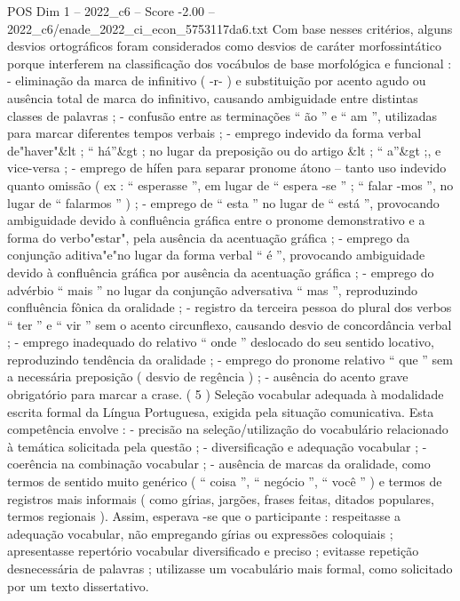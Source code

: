 \begin{textsample}{POS Dim 1 – 2022\_c6 – Score -2.00 – 2022\_c6/enade\_2022\_ci\_econ\_5753117da6.txt}
Com base nesses critérios, alguns desvios ortográficos foram considerados como desvios de caráter morfossintático porque interferem na classificação dos vocábulos de base morfológica e funcional : - eliminação da marca de infinitivo ( -r- ) e substituição por acento agudo ou ausência total de marca do infinitivo, causando ambiguidade entre distintas classes de palavras ; - confusão entre as terminações “ ão ” e “ am ”, utilizadas para marcar diferentes tempos verbais ; - emprego indevido da forma verbal de"haver"\&lt ; “ há”\&gt ; no lugar da preposição ou do artigo \&lt ; “ a”\&gt ;, e vice-versa ; - emprego de hífen para separar pronome átono – tanto uso indevido quanto omissão ( ex : “ esperasse ”, em lugar de “ espera -se ” ; “ falar -mos ”, no lugar de “ falarmos ” ) ; - emprego de “ esta ” no lugar de “ está ”, provocando ambiguidade devido à confluência gráfica entre o pronome demonstrativo e a forma do verbo"estar", pela ausência da acentuação gráfica ; - emprego da conjunção aditiva"e"no lugar da forma verbal “ é ”, provocando ambiguidade devido à confluência gráfica por ausência da acentuação gráfica ; - emprego do advérbio “ mais ” no lugar da conjunção adversativa “ mas ”, reproduzindo confluência fônica da oralidade ; - registro da terceira pessoa do plural dos verbos “ ter ” e “ vir ” sem o acento circunflexo, causando desvio de concordância verbal ; - emprego inadequado do relativo “ onde ” deslocado do seu sentido locativo, reproduzindo tendência da oralidade ; - emprego do pronome relativo “ que ” sem a necessária preposição ( desvio de regência ) ; - ausência do acento grave obrigatório para marcar a crase. ( 5 ) Seleção vocabular adequada à modalidade escrita formal da Língua Portuguesa, exigida pela situação comunicativa.
Esta competência envolve : - precisão na seleção/utilização do vocabulário relacionado à temática solicitada pela questão ; - diversificação e adequação vocabular ; - coerência na combinação vocabular ; - ausência de marcas da oralidade, como termos de sentido muito genérico ( “ coisa ”, “ negócio ”, “ você ” ) e termos de registros mais informais ( como gírias, jargões, frases feitas, ditados populares, termos regionais ).
Assim, esperava -se que o participante : respeitasse a adequação vocabular, não empregando gírias ou expressões coloquiais ; apresentasse repertório vocabular diversificado e preciso ; evitasse repetição desnecessária de palavras ; utilizasse um vocabulário mais formal, como solicitado por um texto dissertativo.

\end{textsample}
